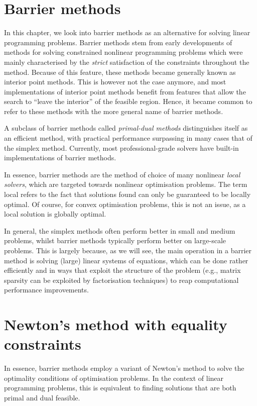 \section{Barrier methods} \label{section_71}

In this chapter, we look into barrier methods as an alternative for solving linear programming problems. Barrier methods stem from early developments of methods for solving constrained nonlinear programming problems which were mainly characterised by the \emph{strict} satisfaction of the constraints throughout the method. Because of this feature, these methods became generally known as interior point methods. This is however not the case anymore, and most implementations of interior point methods benefit from features that allow the search to ``leave the interior'' of the feasible region. Hence, it became common to refer to these methods with the more general name of barrier methods.

A subclass of barrier methods called \emph{primal-dual methods} distinguishes itself as an efficient method, with practical performance surpassing in many cases that of the simplex method. Currently, most professional-grade solvers have built-in implementations of barrier methods.

In essence, barrier methods are the method of choice of many nonlinear \emph{local solvers}, which are targeted towards nonlinear optimisation problems. The term local refers to the fact that solutions found can only be guaranteed to be locally optimal. Of course, for convex optimisation problems, this is not an issue, as a local solution is globally optimal.

In general, the simplex methods often perform better in small and medium problems, whilst barrier methods typically perform better on large-scale problems. This is largely because, as we will see, the main operation in a barrier method is solving (large) linear systems of equations, which can be done rather efficiently and in ways that exploit the structure of the problem (e.g., matrix sparsity can be exploited by factorisation techniques) to reap computational performance improvements.


\section{Newton's method with equality constraints} 


In essence, barrier methods employ a variant of Newton's method to solve the optimality conditions of optimisation problems. In the context of linear programming problems, this is equivalent to finding solutions that are both primal and dual feasible.

